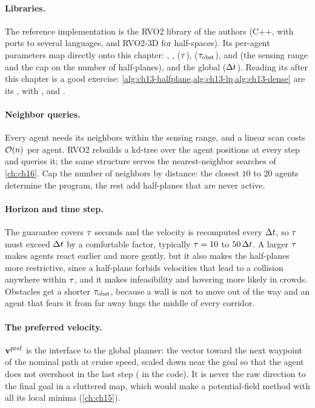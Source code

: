 \paragraph{Libraries.}
The reference implementation is the RVO2 library of the \orca authors
(C++, with ports to several languages, and RVO2-3D for half-spaces). Its
per-agent parameters map directly onto this chapter: ,
,  ($\tau$), 
($\tau_{\mathrm{obst}}$),  and  (the
sensing range and the cap on the number of half-planes), and the global
 ($\Delta t$). Reading its  after this chapter is
a good exercise: \cref{alg:ch13-halfplane,alg:ch13-lp,alg:ch13-dense} are
its ,  with
, and .

\paragraph{Neighbor queries.}
Every agent needs its neighbors within the sensing range, and a linear
scan costs $\mathcal{O}\!\left(n\right)$ per agent. RVO2 rebuilds a kd-tree over the agent
positions at every step and queries it; the same structure serves the
nearest-neighbor searches of \cref{ch:ch16}. Cap the number of neighbors
by distance: the closest $10$ to $20$ agents determine the program, the
rest add half-planes that are never active.

\paragraph{Horizon and time step.}
The guarantee covers $\tau$ seconds and the velocity is recomputed every
$\Delta t$, so $\tau$ must exceed $\Delta t$ by a comfortable factor, typically
$\tau = 10$ to $50\,\Delta t$. A larger $\tau$ makes agents react earlier and more
gently, but it also makes the half-planes more restrictive, since a
half-plane forbids velocities that lead to a collision anywhere within
$\tau$, and it makes infeasibility and hovering more likely in crowds.
Obstacles get a shorter $\tau_{\mathrm{obst}}$, because a wall is not
to move out of the way and an agent that fears it from far away hugs the
middle of every corridor.

\paragraph{The preferred velocity.}
$\mathbf{v}^{\mathrm{pref}}$ is the interface to the global planner: the vector
toward the next waypoint of the nominal path at cruise speed, scaled down
near the goal so that the agent does not overshoot in the last step
( in the code). It is never the raw direction to
the final goal in a cluttered map, which would make \orca a potential-field
method with all its local minima (\cref{ch:ch15}).

